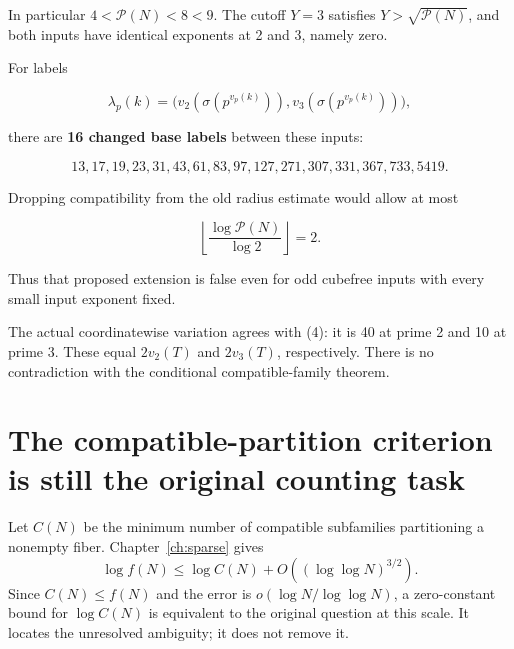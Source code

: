 In particular \(4<\mathcal P(N)<8<9\). The cutoff \(Y=3\) satisfies \(Y>\sqrt{\mathcal P(N)}\), and both inputs have identical exponents at 2 and 3, namely zero.

For labels

\[
\lambda_p(k)=
\bigl(v_2(\sigma(p^{v_p(k)})),v_3(\sigma(p^{v_p(k)}))\bigr),
\]

there are \textbf{16 changed base labels} between these inputs:

\[
13,17,19,23,31,43,61,83,97,127,271,307,331,367,733,5419.
\]

Dropping compatibility from the old radius estimate would allow at most

\[
\left\lfloor\frac{\log\mathcal P(N)}{\log2}\right\rfloor=2.
\]

Thus that proposed extension is false even for odd cubefree inputs with every small input exponent fixed.

The actual coordinatewise variation agrees with (4): it is 40 at prime 2 and 10 at prime 3. These equal \(2v_2(T)\) and \(2v_3(T)\), respectively. There is no contradiction with the conditional compatible-family theorem.

\section{The compatible-partition criterion is still the original counting task}
Let $C(N)$ be the minimum number of compatible subfamilies partitioning a
nonempty fiber. Chapter~\ref{ch:sparse} gives
\[
 \log f(N)\le\log C(N)+O((\log\log N)^{3/2}).
\]
Since $C(N)\le f(N)$ and the error is $o(\log N/\log\log N)$, a zero-constant
bound for $\log C(N)$ is equivalent to the original question at this scale.
It locates the unresolved ambiguity; it does not remove it.
